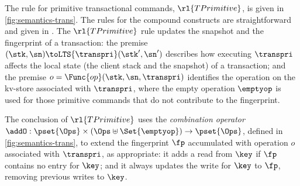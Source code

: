 \begin{figure*}[!t]
\begin{center}
\vspace*{5pt}

\hrulefill

\vspace*{5pt}

\noindent
{}
\end{center}

\spaceshrink{-5pt}

\hrulefill

\caption{The semantics of transactional commands}
\label{fig:semantics-trans}
\end{figure*}


The rule for primitive transactional commands, \( \rl{TPrimitive} \),
is given in \cref{fig:semantics-trans}.
The rules for the compound constructs are straightforward and given in \cite{shale-phd}.
The \( \rl{TPrimitive} \) rule updates 
the snapshot and the fingerprint of a transaction: the premise 
\((\stk, \sn) \toLTS{\transpri} (\stk', \sn')\) describes how executing
\(\transpri\) affects the local state (the client stack and the snapshot) of a transaction; 
and the premise \(o =\Func{op}(\stk, \sn, \transpri)\) identifies the operation on the kv-store associated with \(\transpri\), 
where the empty operation \(\emptyop\) is used for those primitive commands that do not
contribute to the fingerprint.

The conclusion of \( \rl{TPrimitive}\) uses the \emph{combination operator} 
\(\addO: \pset{\Ops} \times (\Ops \uplus \Set{\emptyop}) \to \pset{\Ops}\), defined 
in \cref{fig:semantics-trans}, to extend the fingerprint \(\fp\) accumulated with
operation \(o\) associated with \(\transpri\), as
appropriate: it adds  a read from \(\key\)  if \(\fp\) 
contains no entry for \(\key\);  and it always updates the write for 
\(\key\) to \(\fp\), removing previous writes to \(\key\).

